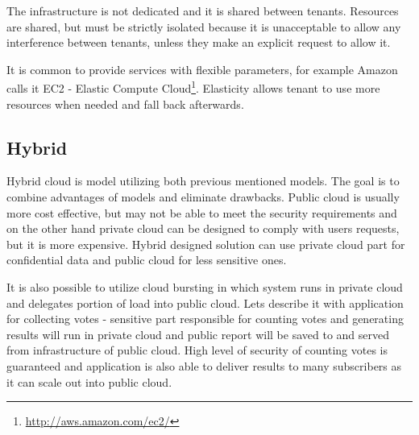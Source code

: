 The infrastructure is not dedicated and it is shared between tenants. Resources are shared, but must be strictly isolated because it is unacceptable to allow any interference between tenants, unless they make an explicit request to allow it.

It is common to provide services with flexible parameters, for example Amazon calls it EC2 - Elastic Compute Cloud\footnote{\url{http://aws.amazon.com/ec2/}}. Elasticity allows tenant to use more resources when needed and fall back afterwards. 

\subsection{Hybrid}
Hybrid cloud is model utilizing both previous mentioned models. The goal is to combine advantages of models and eliminate drawbacks. Public cloud is usually more cost effective, but may not be able to meet the security requirements and on the other hand private cloud can be designed to comply with users requests, but it is more expensive. Hybrid designed solution can use private cloud part for confidential data and public cloud for less sensitive ones. 

It is also possible to utilize cloud bursting in which system runs in private cloud and delegates portion of load into public cloud. Lets describe it with application for collecting votes - sensitive part responsible for counting votes and generating results will run in private cloud and public report will be saved to and served from infrastructure of public cloud. High level of security of counting votes is guaranteed and application is also able to deliver results to many subscribers as it can scale out into public cloud.

